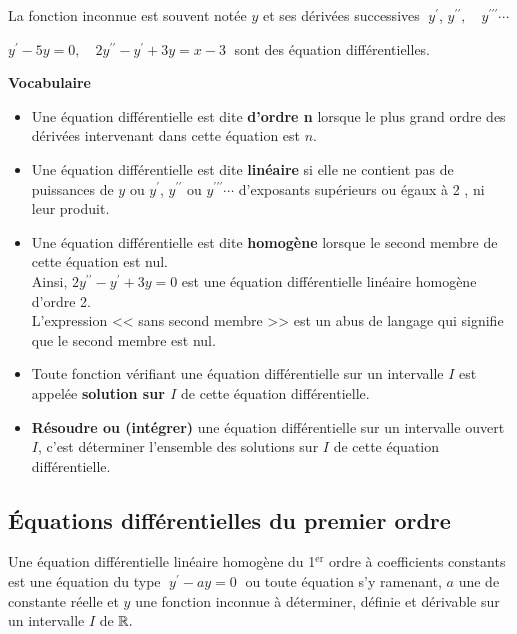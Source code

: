 \begin{notation}
La fonction inconnue est souvent notée $ y $ et ses dérivées successives $\;  y^{\prime}$, $y^{\prime \prime} ,\quad   y^{\prime \prime \prime} \cdots $
\end{notation}

\begin{example}
 $ y^{\prime } -5y=0,\quad  2y^{\prime \prime} -y^{\prime}+3y=x-3\; $ sont des équation différentielles.
\end{example}

\textbf{Vocabulaire}

  \begin{itemize}
\item  Une équation différentielle est dite \textbf{d'ordre n}  lorsque le plus grand ordre des dérivées intervenant dans cette équation est $ n $.
\item  Une équation différentielle est dite \textbf{linéaire}  si elle ne contient pas de puissances de $ y$ ou  $ y^{\prime}$, $y^{\prime \prime} $  ou  $y^{\prime \prime \prime} \cdots $ d'exposants supérieurs ou égaux à 2 , ni leur produit.
\item  Une équation différentielle est dite \textbf{homogène}  lorsque le second membre de cette équation est nul.\\
 Ainsi, \; $ 2y^{\prime \prime} -y^{\prime}+3y=0$ est une équation différentielle linéaire homogène d'ordre 2.\\
 L'expression << sans second membre >>  est un abus de langage qui signifie que le second membre  est nul.
\item Toute fonction vérifiant une équation différentielle  sur un intervalle $ I $  est appelée \textbf{solution sur $ I $} de cette équation différentielle.
\item \textbf{Résoudre ou (intégrer)} une équation différentielle sur un intervalle ouvert $ I $, c'est déterminer l'ensemble des solutions sur $ I $ de cette équation différentielle.
\end{itemize}


\subsection{Équations différentielles du premier ordre}
\begin{definition}
Une équation différentielle linéaire homogène du 1$ ^{\text{er}} $ ordre  à coefficients constants  est une équation du type  $ \;y^{\prime} -ay=0\;$ ou toute équation s'y ramenant,  $a $ une de constante réelle et $ y $ une fonction inconnue à déterminer, définie et dérivable sur un intervalle $ I$ de  $ \mathbb{R}.$
\end{definition}
\medskip

